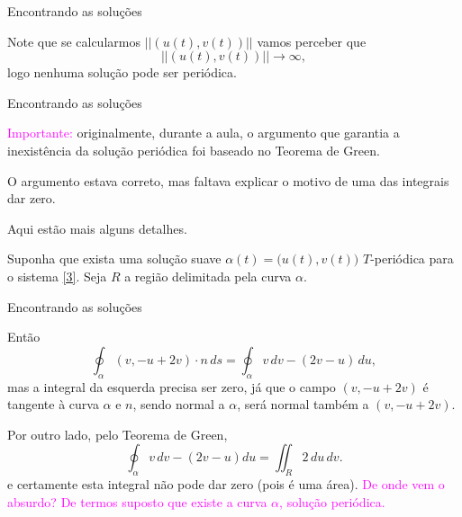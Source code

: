 \documentclass[11pt]{beamer}
\DeclareMathOperator{\sen}{sen}
\newcommand{\ra}{\rightarrow}
\begin{document}
\begin{frame}[t]{Encontrando as soluções}


Note que se calcularmos $||(u(t),v(t))||$ vamos perceber que $$||(u(t),v(t))||\ra \infty,$$ logo nenhuma solução pode ser periódica.


\end{frame}


\begin{frame}[t]{Encontrando as soluções}

\textcolor{magenta}{Importante:} originalmente, durante a aula, o argumento que garantia a inexistência da solução periódica foi baseado no Teorema de Green.

O argumento estava correto, mas faltava explicar o motivo de uma das integrais dar zero.

Aqui estão mais alguns detalhes.


Suponha que exista uma solução suave $\alpha(t)=\big(u(t),v(t)\big)$ $T$-periódica para o sistema \eqref{3}. Seja $R$ a região delimitada pela curva $\alpha$.

\end{frame}

\begin{frame}[t]{Encontrando as soluções}

Então
\[\oint_{\alpha} (v,-u+2v)\cdot n\,ds=\oint_{\alpha} v\,dv-(2v-u)\,du,\]
mas a integral da esquerda precisa ser zero, já que o campo $(v,-u+2v)$ é tangente à curva $\alpha$ e $n$, sendo normal a $\alpha$, será normal também a $(v,-u+2v)$.

Por outro lado, pelo Teorema de Green,
\[\displaystyle \oint_\alpha v\,dv-(2v-u)du=\iint_R 2\,du\,dv.\] e certamente esta integral não pode dar zero (pois é uma área). \textcolor{magenta}{De onde vem o absurdo? De termos suposto que existe a curva $\alpha$, solução periódica.}






\end{frame}


%
%
%
%
%
%
%
\end{document}
